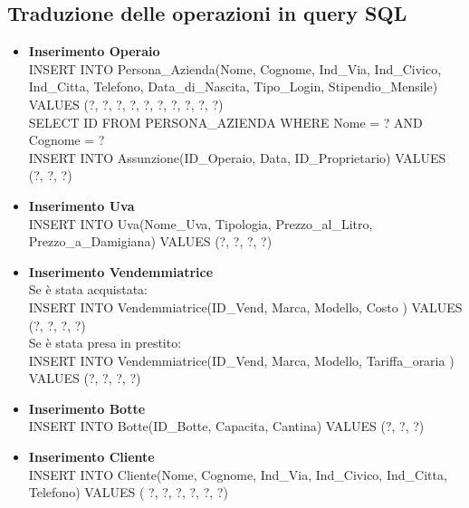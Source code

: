 \documentclass{article}
\begin{document}
\subsection{Traduzione delle operazioni in query SQL}
\begin{itemize}
\item \textbf{Inserimento Operaio}\\\newline
INSERT INTO Persona\_Azienda(Nome, Cognome, Ind\_Via, Ind\_Civico, Ind\_Citta, Telefono, Data\_di\_Nascita, Tipo\_Login, Stipendio\_Mensile)  VALUES (?, ?, ?, ?, ?, ?, ?, ?, ?, ?)\\\newline
SELECT ID FROM PERSONA\_AZIENDA WHERE Nome = ? AND Cognome = ?\\\newline
INSERT INTO Assunzione(ID\_Operaio, Data, ID\_Proprietario)  VALUES (?, ?, ?)\\\newline
\item \textbf{Inserimento Uva}\\\newline
INSERT INTO Uva(Nome\_Uva, Tipologia, Prezzo\_al\_Litro, Prezzo\_a\_Damigiana) VALUES (?, ?, ?, ?)\\\newline
\item \textbf{Inserimento Vendemmiatrice}\\\newline
Se è stata acquistata:  \\
INSERT INTO Vendemmiatrice(ID\_Vend, Marca, Modello, Costo ) VALUES (?, ?, ?, ?)\\\newline
Se è stata presa in prestito:\\
INSERT INTO Vendemmiatrice(ID\_Vend, Marca, Modello, Tariffa\_oraria ) VALUES (?, ?, ?, ?)\\\newline
\item \textbf{Inserimento Botte}\\\newline
INSERT INTO Botte(ID\_Botte, Capacita, Cantina) VALUES (?, ?, ?)\\\newline
\item \textbf{Inserimento Cliente}\\\newline
INSERT INTO Cliente(Nome, Cognome, Ind\_Via, Ind\_Civico, Ind\_Citta, Telefono) VALUES ( ?, ?, ?, ?, ?, ?)\\\newline

\end{itemize}
\end{document}
